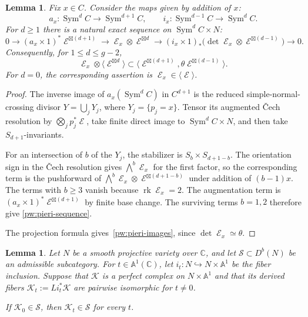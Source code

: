 \documentclass[11pt,letterpaper]{amsart}
\theoremstyle{plain}
\newtheorem{lemma}[theorem]{Lemma}
\theoremstyle{definition}
\theoremstyle{remark}
\numberwithin{equation}{section}
\DeclareMathOperator{\rk}{rk}
\DeclareMathOperator{\Sym}{Sym}
\DeclareMathOperator{\cE}{\mathcal{E}}
\begin{document}
\begin{lemma}\label{pw:pieri}
Fix $x\in C$.  Consider the maps given by addition of $x$:
\[
 a_x:\Sym^dC\longrightarrow\Sym^{d+1}C,\qquad
 i_x:\Sym^{d-1}C\longrightarrow\Sym^dC.
\]
For $d\geq1$ there is a natural exact sequence on $\Sym^dC\times N$:
\begin{equation}\label{pw:pieri-sequence}
 0\rightarrow (a_x\times1)^*\cE^{\boxtimes(d+1)}
 \rightarrow \cE_x\otimes\cE^{\boxtimes d}
 \rightarrow (i_x\times1)_*
       \bigl(\det\cE_x\otimes\cE^{\boxtimes(d-1)}\bigr)
 \rightarrow0.
\end{equation}
Consequently, for $1\leq d\leq g-2$,
\begin{equation}\label{pw:pieri-images}
 \cE_x\otimes\langle\cE^{\boxtimes d}\rangle
 \subset
 \langle\cE^{\boxtimes(d+1)},\theta\cE^{\boxtimes(d-1)}\rangle.
\end{equation}
For $d=0$, the corresponding assertion is
$\cE_x\in\langle\cE\rangle$.
\end{lemma}

\begin{proof}
The inverse image of $a_x(\Sym^dC)$ in $C^{d+1}$ is the reduced
simple-normal-crossing divisor $Y=\bigcup_jY_j$, where
$Y_j=\{p_j=x\}$. Tensor its augmented \v Cech resolution by
$\bigotimes_jp_j^*\cE$, take finite direct image to $\Sym^dC\times N$,
and then take $S_{d+1}$-invariants.

For an intersection of $b$ of the $Y_j$, the stabilizer is
$S_b\times S_{d+1-b}$. The orientation sign in the \v Cech resolution
gives $\bigwedge^b\cE_x$ for the first factor, so the corresponding
term is the pushforward of
$
 \bigwedge^b\cE_x\otimes\cE^{\boxtimes(d+1-b)}
$
under addition of $(b-1)x$. The terms with $b\ge3$ vanish because
$\rk\cE_x=2$. The augmentation term is
$(a_x\times1)^*\cE^{\boxtimes(d+1)}$ by finite base change.
The surviving terms $b=1,2$ therefore give
\eqref{pw:pieri-sequence}.

The projection formula gives~\eqref{pw:pieri-images}, since
$\det\cE_x\simeq\theta$.
\end{proof}


\begin{lemma}\label{pw:admissible-deformation}
Let $N$ be a smooth projective variety over $\mathbb C$, and let
$\mathcal S\subset D^b(N)$ be an admissible subcategory.
For $t\in\mathbb A^1(\mathbb C)$, let
$i_t:N\hookrightarrow N\times\mathbb A^1$ be the fiber inclusion.
Suppose that $\mathcal K$ is a perfect complex on
$N\times\mathbb A^1$ and that its derived fibers
$
 \mathcal K_t:=Li_t^*\mathcal K
$
are pairwise isomorphic for $t\ne0$. 

If $\mathcal K_0\in\mathcal S$,
then $\mathcal K_t\in\mathcal S$ for every $t$.
\end{lemma}
\end{document}
